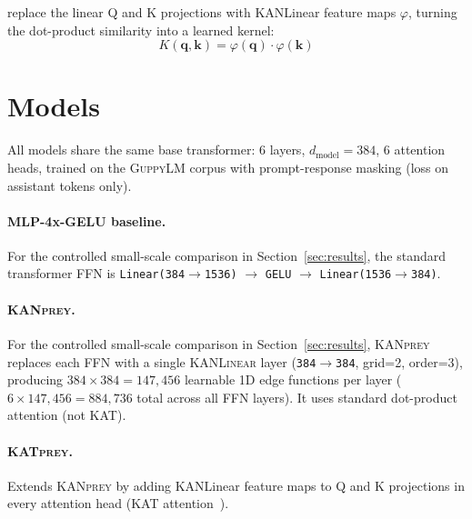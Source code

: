 \documentclass{article}
\newcommand{\kanprey}{\textsc{KANprey}}
\newcommand{\katprey}{\textsc{KATprey}}
\newcommand{\guppylm}{\textsc{GuppyLM}}
\newcommand{\kanlinear}{\textsc{KANLinear}}
\begin{document}
\citet{yang2024kat} replace the linear Q and K projections with KANLinear
feature maps $\varphi$, turning the dot-product similarity into a learned
kernel:
\begin{equation}
  K(\mathbf{q}, \mathbf{k}) = \varphi(\mathbf{q}) \cdot \varphi(\mathbf{k})
\end{equation}

\section{Models}
\label{sec:models}

All models share the same base transformer: 6 layers, $d_\text{model}=384$,
6 attention heads, trained on the \guppylm{} corpus with prompt-response
masking (loss on assistant tokens only).

\paragraph{MLP-4x-GELU baseline.}
For the controlled small-scale comparison in Section~\ref{sec:results}, the
standard transformer FFN is \texttt{Linear(384$\to$1536)} $\to$ \texttt{GELU}
$\to$ \texttt{Linear(1536$\to$384)}.

\paragraph{\kanprey{}.}
For the controlled small-scale comparison in Section~\ref{sec:results},
\kanprey{} replaces each FFN with a single \kanlinear{} layer
(\texttt{384$\to$384}, grid=2, order=3), producing
$384 \times 384 = 147{,}456$ learnable 1D edge functions per layer
($6 \times 147{,}456 = 884{,}736$ total across all FFN layers).
It uses standard dot-product attention (not KAT).

\paragraph{\katprey{}.}
Extends \kanprey{} by adding KANLinear feature maps to Q and K projections
in every attention head (KAT attention~\citep{yang2024kat}).
\end{document}

